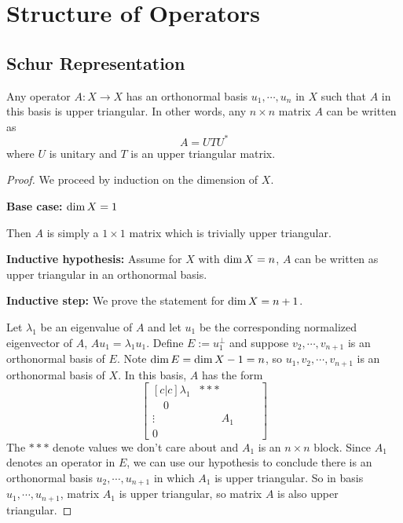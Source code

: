 \chapter{Structure of Operators}

\section{Schur Representation} 

\begin{theorem}
Any operator $A: X \rightarrow X$ has an orthonormal basis $u_{1}, \cdots, u_{n}$ in $X$ such that $A$ in this basis is upper triangular. In other words, any $n \times n$ matrix $A$ can be written as 
$$A = UTU^{*}$$
where $U$ is unitary and $T$ is an upper triangular matrix. 
\end{theorem}

\begin{proof}
We proceed by induction on the dimension of $X$. 

\textbf{Base case:} $\operatorname{dim} X = 1$

Then $A$ is simply a $1 \times 1$ matrix which is trivially upper triangular. 

\textbf{Inductive hypothesis:} Assume for $X$ with $\operatorname{dim} X = n$, $A$ can be written as upper triangular in an orthonormal basis. 

\textbf{Inductive step:} We prove the statement for $\operatorname{dim} X = n + 1$. 

Let $\lambda_{1}$ be an eigenvalue of $A$ and let $u_{1}$ be the corresponding normalized eigenvector of $A$, $Au_{1} = \lambda_{1} u_{1}$. Define $E := u_{1}^{\perp}$ and suppose $v_{2}, \cdots, v_{n + 1}$ is an orthonormal basis of $E$. Note $\operatorname{dim} E = \operatorname{dim} X - 1 = n$, so $u_{1}, v_{2}, \cdots, v_{n + 1}$ is an orthonormal basis of $X$. In this basis, $A$ has the form 
$$\begin{bmatrix}[c|c]
\lambda_{1} & *** \\
\hline 
\quad 0 \quad &  \\
\vdots & \qquad A_{1} \qquad \\
0 & 
\end{bmatrix}
$$
The $***$ denote values we don't care about and $A_{1}$ is an $n \times n$ block. Since $A_{1}$ denotes an operator in $E$, we can use our hypothesis to conclude there is an orthonormal basis $u_{2}, \cdots, u_{n + 1}$ in which $A_{1}$ is upper triangular. So in basis $u_{1}, \cdots, u_{n + 1}$, matrix $A_{1}$ is upper triangular, so matrix $A$ is also upper triangular.
\end{proof}

